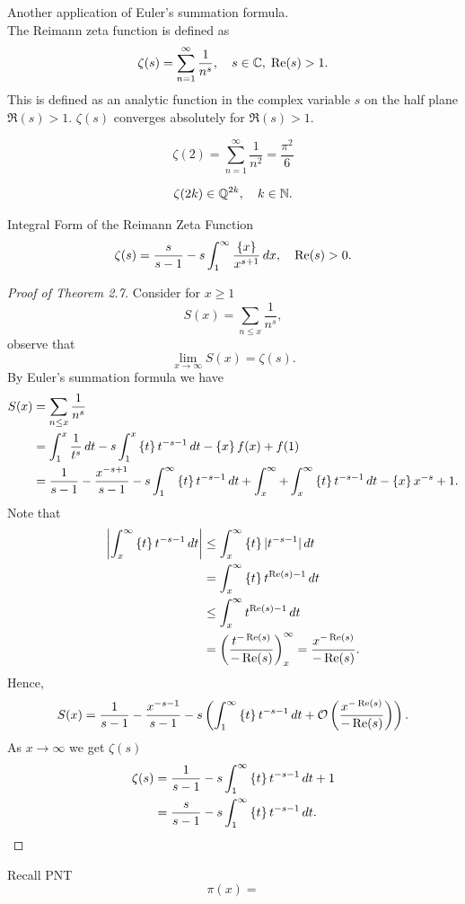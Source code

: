 \documentclass[twoside, openright, fontsize=10pt, headings=big]{scrbook}
\begin{document}
Another application of Euler's summation formula.\\
The Reimann zeta function is defined as 
\[
    \zeta(s)=\sum_{n=1}^{\infty}\frac{1}{n^s},\quad s\in\mathbb{C},\; \Re(s)>1.
\]
This is defined as an analytic function in the complex variable $s$ on the half plane $\Re(s)>1$. $\zeta(s)$ converges absolutely for $\Re(s)>1$.
\begin{example}{}{}
    \[
        \zeta(2)=\sum_{n=1}^{\infty}\frac{1}{n^2}=\frac{\pi^2}{6}
    \]
\end{example}
\begin{example}{}{}
    \[
        \zeta(2k)\in\mathbb{Q}^{2k},\quad k\in\mathbb{N}.
    \]
\end{example}
\begin{theorem}{Integral Form of the Reimann Zeta Function}{}
    \[
        \zeta(s)=\frac{s}{s-1}-s\int_{1}^{\infty}\frac{\left\{ x \right\}}{x^{s+1}}\,dx,\quad \Re(s)>0.
    \]
\end{theorem}
\begin{proof}[Proof of Theorem 2.7]
    Consider for $x\geq1$
    \[
        S(x)=\sum_{n\leq x}\frac{1}{n^s},
    \]
    observe that 
    \[
        \lim_{x\to\infty}S(x)=\zeta(s).
    \]
    By Euler's summation formula we have
    \begin{align*}
        S(x)&=\sum_{n\leq x}\frac{1}{n^s}\\
        &=\int_{1}^{x}\frac{1}{t^s}\,dt-s\int_{1}^{x}\left\{ t \right\}t^{-s-1}\,dt-\left\{ x \right\}f(x)+f(1)\\
        &=\frac{1}{s-1}-\frac{x^{-s+1}}{s-1}-s\int_{1}^{\infty}\left\{ t \right\}t^{-s-1}\,dt+\int_{x}^{\infty}+\int_{x}^{\infty}\left\{ t \right\}t^{-s-1}\,dt-\left\{ x \right\}x^{-s}+1.
    \end{align*}
    Note that
    \begin{align*}
        \left|\int_{x}^{\infty}\left\{ t \right\}t^{-s-1}\,dt\right|&\leq\int_{x}^{\infty}\left\{ t \right\}|t^{-s-1}|\,dt\\
        &=\int_{x}^{\infty}\left\{ t \right\}t^{\Re(s)-1}\,dt\\
        &\leq\int_{x}^{\infty}t^{\Re(s)-1}\,dt\\
        &=\left(\frac{t^{-\Re(s)}}{-\Re(s)}\right)^\infty_x=\frac{x^{-\Re(s)}}{-\Re(s)}.
    \end{align*}
    Hence, 
    \[
        S(x)=\frac{1}{s-1}-\frac{x^{-s-1}}{s-1}-s\left(\int_{1}^{\infty}\left\{ t \right\}t^{-s-1}\,dt+\mathcal{O}\left(\frac{x^{-\Re(s)}}{-\Re(s)}\right)\right).
    \]
    As $x\to\infty$ we get $\zeta(s)$
    \begin{align*}
        \zeta(s)&=\frac{1}{s-1}-s\int_{1}^{\infty}\left\{ t \right\}t^{-s-1}\,dt+1\\
        &=\frac{s}{s-1}-s\int_{1}^{\infty}\left\{ t \right\}t^{-s-1}\,dt.\qedhere
    \end{align*}
\end{proof}
Recall PNT
    \[
        \pi(x)=
    \]
\end{document}
